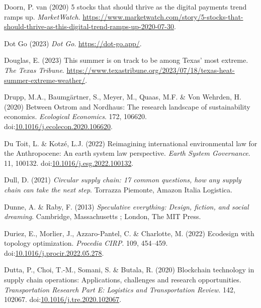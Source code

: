 \documentclass[
  letterpaper,
  DIV=11,
  numbers=noendperiod]{scrartcl}
\newlength{\cslhangindent}
\newenvironment{CSLReferences}[2] %
 {\begin{list}{}{%
  \setlength{\itemindent}{0pt}
  \setlength{\leftmargin}{0pt}
  \setlength{\parsep}{0pt}
  \ifodd #1
   \setlength{\leftmargin}{\cslhangindent}
   \setlength{\itemindent}{-1\cslhangindent}
  \fi
  \setlength{\itemsep}{#2\baselineskip}}}
 {\end{list}}
\begin{document}
\begin{CSLReferences}{0}{1}
Doorn, P. van (2020) 5 stocks that should thrive as the digital payments
trend ramps up. \emph{MarketWatch}.
\url{https://www.marketwatch.com/story/5-stocks-that-should-thrive-as-this-digital-trend-ramps-up-2020-07-30}.

Dot Go (2023) \emph{Dot {Go}}. \url{https://dot-go.app/}.

Douglas, E. (2023) This summer is on track to be among {Texas}' most
extreme. \emph{The Texas Tribune}.
\url{https://www.texastribune.org/2023/07/18/texas-heat-summer-extreme-weather/}.

Drupp, M.A., Baumgärtner, S., Meyer, M., Quaas, M.F. \& Von Wehrden, H.
(2020) Between {Ostrom} and {Nordhaus}: {The} research landscape of
sustainability economics. \emph{Ecological Economics}. 172, 106620.
doi:\href{https://doi.org/10.1016/j.ecolecon.2020.106620}{10.1016/j.ecolecon.2020.106620}.

Du Toit, L. \& Kotzé, L.J. (2022) Reimagining international
environmental law for the {Anthropocene}: {An} earth system law
perspective. \emph{Earth System Governance}. 11, 100132.
doi:\href{https://doi.org/10.1016/j.esg.2022.100132}{10.1016/j.esg.2022.100132}.

Dull, D. (2021) \emph{Circular supply chain: 17 common questions, how
any supply chain can take the next step}. Torrazza Piemonte, Amazon
Italia Logistica.

Dunne, A. \& Raby, F. (2013) \emph{Speculative everything: Design,
fiction, and social dreaming}. Cambridge, Massachusetts ; London, The
MIT Press.

Duriez, E., Morlier, J., Azzaro-Pantel, C. \& Charlotte, M. (2022)
Ecodesign with topology optimization. \emph{Procedia CIRP}. 109,
454--459.
doi:\href{https://doi.org/10.1016/j.procir.2022.05.278}{10.1016/j.procir.2022.05.278}.

Dutta, P., Choi, T.-M., Somani, S. \& Butala, R. (2020) Blockchain
technology in supply chain operations: {Applications}, challenges and
research opportunities. \emph{Transportation Research Part E: Logistics
and Transportation Review}. 142, 102067.
doi:\href{https://doi.org/10.1016/j.tre.2020.102067}{10.1016/j.tre.2020.102067}.


\end{CSLReferences}
\end{document}
